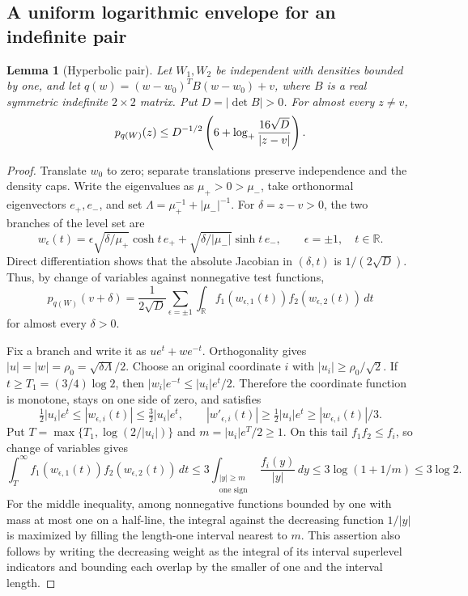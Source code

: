 \documentclass[11pt]{article}
\numberwithin{equation}{section}
\newtheorem{lemma}[theorem]{Lemma}
\theoremstyle{definition}\newtheorem{definition}[theorem]{Definition}
\theoremstyle{remark}\newtheorem{remark}[theorem]{Remark}
\newcommand{\R}{\mathbb R}\newcommand{\E}{\mathbb E}\newcommand{\PP}{\mathbb P}
\newcommand{\1}{\mathbf 1}\newcommand{\diag}{\operatorname{diag}}
\begin{document}
\subsection{A uniform logarithmic envelope for an indefinite pair}
\begin{lemma}[Hyperbolic pair]\label{lem:hyperbola}
Let $W_1,W_2$ be independent with densities bounded by one, and let
$q(w)=(w-w_0)^TB(w-w_0)+v$, where $B$ is a real symmetric indefinite $2\times2$ matrix. Put $D=|\det B|>0$. For almost every $z\ne v$,
\begin{equation}\label{eq:hyperbola}
 p_{q(W)}(z)\le D^{-1/2}
 \left(6+\log_+\frac{16\sqrt D}{|z-v|}\right).
\end{equation}
\end{lemma}
\begin{proof}
Translate $w_0$ to zero; separate translations preserve independence and the density caps. Write the eigenvalues as $\mu_+>0>\mu_-$, take orthonormal eigenvectors $e_+,e_-$, and set $\Lambda=\mu_+^{-1}+|\mu_-|^{-1}$. For $\delta=z-v>0$, the two branches of the level set are
\[
 w_\epsilon(t)=\epsilon\sqrt{\delta/\mu_+}\cosh t\,e_+
 +\sqrt{\delta/|\mu_-|}\sinh t\,e_-,
 \qquad \epsilon=\pm1,\quad t\in\R.
\]
Direct differentiation shows that the absolute Jacobian in $(\delta,t)$ is $1/(2\sqrt D)$. Thus, by change of variables against nonnegative test functions,
\begin{equation}\label{eq:hyper-coarea}
 p_{q(W)}(v+\delta)=\frac1{2\sqrt D}
 \sum_{\epsilon=\pm1}\int_\R f_1(w_{\epsilon,1}(t))f_2(w_{\epsilon,2}(t))\,dt
\end{equation}
for almost every $\delta>0$.

Fix a branch and write it as $ue^t+we^{-t}$. Orthogonality gives $|u|=|w|=\rho_0=\sqrt{\delta\Lambda}/2$. Choose an original coordinate $i$ with $|u_i|\ge\rho_0/\sqrt2$. If $t\ge T_1=(3/4)\log2$, then $|w_i|e^{-t}\le|u_i|e^t/2$. Therefore the coordinate function is monotone, stays on one side of zero, and satisfies
\[
 \tfrac12|u_i|e^t\le|w_{\epsilon,i}(t)|\le\tfrac32|u_i|e^t,
 \qquad |w'_{\epsilon,i}(t)|\ge\tfrac12|u_i|e^t\ge |w_{\epsilon,i}(t)|/3.
\]
Put $T=\max\{T_1,\log(2/|u_i|)\}$ and $m=|u_i|e^T/2\ge1$. On this tail $f_1f_2\le f_i$, so change of variables gives
\[
 \int_T^\infty f_1(w_{\epsilon,1}(t))f_2(w_{\epsilon,2}(t))\,dt
 \le3\int_{\substack{|y|\ge m\\\text{one sign}}}\frac{f_i(y)}{|y|}\,dy
 \le3\log(1+1/m)\le3\log2.
\]
For the middle inequality, among nonnegative functions bounded by one with mass at most one on a half-line, the integral against the decreasing function $1/|y|$ is maximized by filling the length-one interval nearest to $m$. This assertion also follows by writing the decreasing weight as the integral of its interval superlevel indicators and bounding each overlap by the smaller of one and the interval length.


\end{proof}
\end{document}
